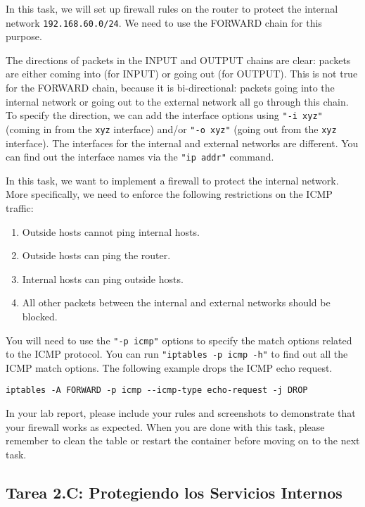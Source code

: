 In this task, we will set up firewall rules on the router to protect the 
internal network \texttt{192.168.60.0/24}. We need to use the 
FORWARD chain for this purpose. 

The directions of packets in the INPUT and OUTPUT chains are clear:
packets are either coming into (for INPUT) or going out (for OUTPUT). 
This is not true for the FORWARD chain, because it is 
bi-directional: packets going into
the internal network or going out to the external network
all go through this chain. To specify the direction,
we can add the interface options using \texttt{"-i xyz"} (coming in from 
the \texttt{xyz} interface) and/or \texttt{"-o xyz"} (going out 
from the \texttt{xyz} interface). The interfaces 
for the internal and external networks are different.
You can find out the interface names via the 
\texttt{"ip addr"} command.


In this task, we want to implement a firewall to protect the 
internal network. More specifically, we need to enforce the 
following restrictions on the ICMP traffic: 

\begin{enumerate}[noitemsep]
  \item Outside hosts cannot ping internal hosts. 
  \item Outside hosts can ping the router.
  \item Internal hosts can ping outside hosts. 
  \item All other packets between the internal and external networks should be blocked.
\end{enumerate}

You will need to use the \texttt{"-p icmp"} options to specify the match
options related to the ICMP protocol. You can run 
\texttt{"iptables -p icmp -h"} to find out all the ICMP match
options. The following example drops the ICMP echo request.


\begin{lstlisting}
iptables -A FORWARD -p icmp --icmp-type echo-request -j DROP
\end{lstlisting}

In your lab report, please include your rules and  
screenshots to demonstrate that your firewall works as expected.
When you are done with this task,
please remember to clean the table or restart the container 
before moving on to the next task.


\subsection{Tarea 2.C: Protegiendo los Servicios Internos}

